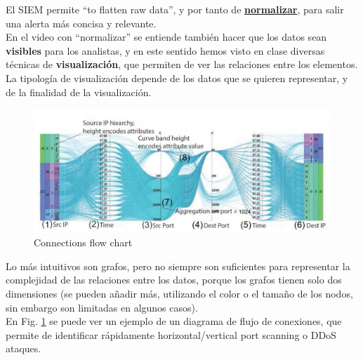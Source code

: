 El \textsc{SIEM} permite ``to flatten raw data'', y por tanto de \ul{\textbf{normalizar}}, para salir una alerta más concisa y relevante.\\
En el video con ``normalizar'' se entiende también hacer que los datos sean \textbf{visibles} para los analistas, y en este sentido hemos visto en clase diversas técnicas de \textbf{visualización}, que permiten de ver las relaciones entre los elementos.\\
La tipología de visualización depende de los datos que se quieren representar, y de la finalidad de la visualización.
\begin{paracol}{2}
   

   \begin{figure}[htbp]
      \centering
      \includegraphics[width=0.75\columnwidth]{images/chart.png}
      \caption{Connections flow chart}
      \label{fig:chart}
   \end{figure}

   \switchcolumn
   \colfill
   Lo más intuitivos son grafos, pero no siempre son suficientes para representar la complejidad de las relaciones entre los datos, porque los grafos tienen solo dos dimensiones (se pueden añadir más, utilizando el color o el tamaño de los nodos, sin embargo son limitadas en algunos casos).\\
   En Fig. \ref{fig:chart} se puede ver un ejemplo de un diagrama de flujo de conexiones, que permite de identificar rápidamente horizontal/vertical port scanning o DDoS ataques.
   \colfill
\end{paracol}

\newpage
